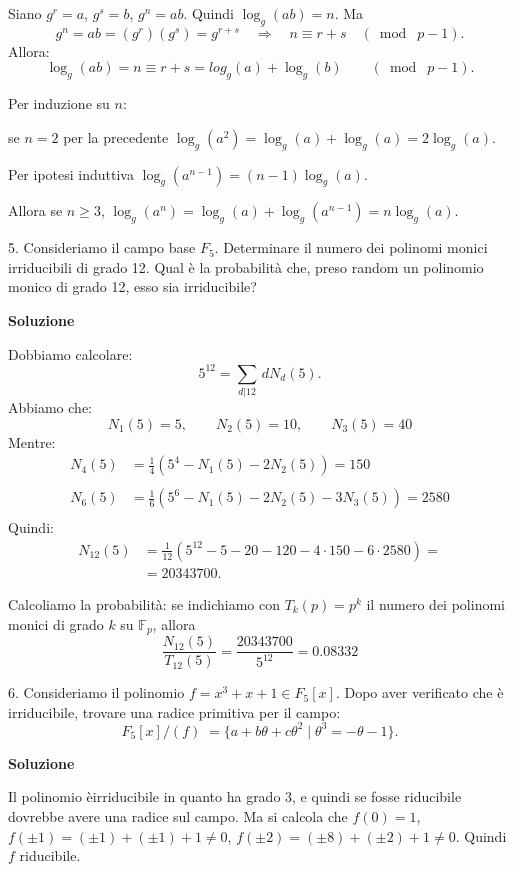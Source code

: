 \documentclass[italian,a4paper,10pt]{report}
\newcommand{\e}{\`e\;}
\newcommand{\F}{\mathbb{F}}
\begin{document}
Siano $g^r = a$, $g^s = b$, $g^n = ab$. Quindi $\log_g (ab) = n$.
Ma
$$g^n = ab =(g^r)(g^s) = g^{r+s} \quad \Longrightarrow \quad n
\equiv r+s \quad (\bmod\;p-1).
$$
Allora:
$$
\log_g (ab) = n \equiv r + s = log_g(a) + \log_g(b) \qquad
(\bmod\;p-1).
$$

Per induzione su $n$:

se $n=2$ per la precedente $\log_g(a^2) = \log_g(a) + \log_g(a) =
2\log_g(a)$.

Per ipotesi induttiva $\log_g(a^{n-1}) = (n-1)\log_g(a)$.

Allora se $n \geq 3$, $\log_g(a^{n}) = \log_g(a) + \log_g(a^{n-1})
= n\log_g(a)$. \vspace{5mm}

5. Consideriamo il campo base $F_5$. Determinare il numero dei
polinomi monici irriducibili di grado 12. Qual \`{e} la
probabilit\`{a} che, preso random un polinomio monico di grado 12,
esso sia irriducibile?  \vspace{5mm}

{\bf Soluzione}

Dobbiamo calcolare:
$$
5^{12} = \sum_{d|12}\, dN_d(5).
$$
Abbiamo che:
$$
N_1(5) = 5, \qquad N_2(5) = 10, \qquad N_3(5) = 40
$$
Mentre:
\begin{align*}
N_4(5) &=\frac{1}{4} \left( 5^4 - N_1(5) - 2N_2(5) \right) = 150\\
\\
N_6(5) &= \frac{1}{6} \left( 5^6 - N_1(5) - 2N_2(5) - 3N_3(5)
\right) = 2580\\
\end{align*}
Quindi:
\begin{align*}
N_{12}(5) &= \frac{1}{12} (5^{12} - 5 - 20 - 120 - 4\cdot 150 -
6\cdot 2580) =\\
&=20343700.
\end{align*}

Calcoliamo la probabilit\`{a}: se indichiamo con $T_{k}(p)=p^k$ il
numero dei polinomi monici di grado $k$ su $\F_p$, allora
$$
\frac{N_{12}(5)}{T_{12}(5)} = \frac{20343700}{5^{12}} = 0.08332
$$ \vspace{5mm}


6. Consideriamo il polinomio $f = x^3 + x +1 \in F_5[x]$. Dopo
aver verificato che \`{e} irriducibile, trovare una radice
primitiva per il campo:
$$F_{5}[x]/(f) \; = \{a + b\theta + c\theta^2\; |\;
\theta^3 = - \theta -1 \}.$$ \vspace{2mm}

{\bf Soluzione}

Il polinomio \e irriducibile in quanto ha grado $3$, e quindi se
fosse riducibile dovrebbe avere una radice sul campo. Ma si
calcola che $f(0) = 1$, $f(\pm 1) = (\pm 1) + (\pm 1)+1 \ne 0$,
$f(\pm 2) = (\pm 8) + (\pm 2)+1 \ne 0$. Quindi $f$ riducibile.
\end{document}

